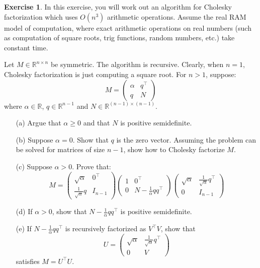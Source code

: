 \documentclass[11pt]{article}
\theoremstyle{definition}
\newtheorem{exercise}{Exercise}
\newcommand{\R}{\mathbb{R}}
\begin{document}
\vspace{.5cm}
\begin{exercise}
In this exercise, you will work out an algorithm for Cholesky factorization which uses $O(n^3)$ arithmetic operations. Assume the real RAM model of computation, where exact arithmetic operations on real numbers (such as computation of square roots, trig functions, random numbers, etc.) take constant time.

Let $M \in \R^{n \times n}$ be symmetric. The algorithm is recursive. Clearly, when $n=1$, Cholesky factorization is just computing a square root. For $n > 1$, suppose:
$$M = 
\left(
\begin{array}{cc}
\alpha & q^\top\\
q & N
\end{array}
\right)
$$
where $\alpha \in \R$, $q \in \R^{n-1}$ and $N \in \R^{(n-1)\times (n-1)}$. 
\begin{enumerate}
\item[(a)]
Argue that $\alpha \geq 0$ and that $N$ is positive semidefinite.
\item[(b)]
Suppose $\alpha = 0$. Show that $q$ is the zero vector. Assuming the problem can be solved for matrices of size $n-1$, show how to Cholesky factorize $M$. 
\item[(c)]
Suppose $\alpha > 0$. Prove that:
$$
M = 
\left(\begin{array}{cc} \sqrt{\alpha} & 0^\top \\ \frac{1}{\sqrt{\alpha}} q & I_{n-1}\end{array}\right)
\left(\begin{array}{cc} 1 & 0^\top \\ 0 & N-\frac{1}{\alpha}qq^\top\end{array}\right)
\left(\begin{array}{cc} \sqrt{\alpha} & \frac{1}{\sqrt{\alpha}} q^\top \\ 0 & I_{n-1}\end{array}\right)
$$
\item[(d)]
If $\alpha > 0$, show that $N-\frac{1}{\alpha}qq^\top$ is positive semidefinite.
\item[(e)]
If $N-\frac{1}{\alpha}qq^\top$ is recursively factorized as $V^\top V$, show that 
$$U = \left(\begin{array}{cc} \sqrt{\alpha} & \frac{1}{\sqrt{\alpha}} q^\top \\ 0 & V\end{array} \right)$$
satisfies $M = U^\top U$. 
\end{enumerate}
\end{exercise}
\end{document}
